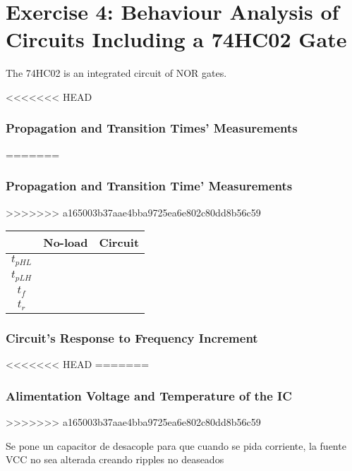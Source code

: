 \documentclass[a4paper,11pt]{report}
\begin{document}
\section{\color{olive}Exercise 4: Behaviour Analysis of Circuits Including a 74HC02 Gate}

The 74HC02 is an integrated circuit of NOR gates.

<<<<<<< HEAD
\subsubsection{\color{red}Propagation and Transition Times' Measurements}
=======
\subsubsection{\color{red}Propagation and Transition Time' Measurements}
>>>>>>> a165003b37aae4bba9725ea6e802c80dd8b56c59

\begin{tabular}{|c|c|c|}
\hline
 &No-load & Circuit \\ %
\hline
\hline
$t_{pHL}$ & &  \\
\hline
$t_{pLH}$ &  & \\
\hline
$t_{f}$ &  & \\
\hline
$t_{r}$ & & \\
\hline
\end{tabular}


\subsubsection{\color{red}Circuit's Response to Frequency Increment}


<<<<<<< HEAD
=======
\subsubsection{\color{red}Alimentation Voltage and Temperature of the IC}


>>>>>>> a165003b37aae4bba9725ea6e802c80dd8b56c59

Se pone un capacitor de desacople para que cuando se pida corriente, la fuente VCC no sea alterada creando ripples no deaseados 
\end{document}
